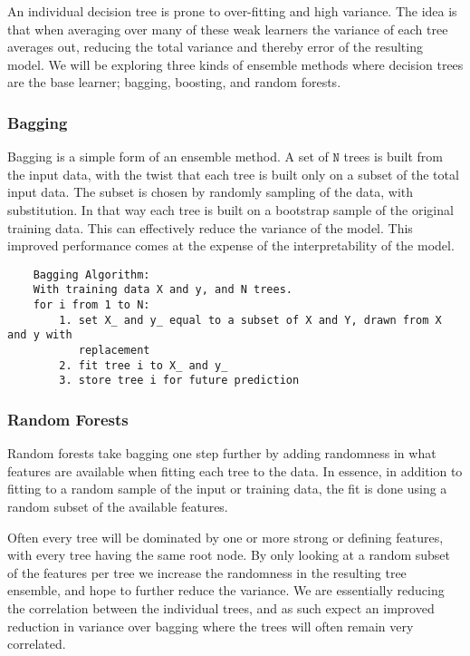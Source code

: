 \documentclass[11pt]{article}
\begin{document}
An individual decision tree is prone to over-fitting and high
variance. The idea is that when averaging over many of these weak
learners the variance of each tree averages out, reducing the total
variance and thereby error of the resulting model. We will be exploring three kinds of ensemble methods where
decision trees are the base learner; bagging, boosting, and random
forests.

    \hypertarget{bagging}{%
\subsubsection{Bagging}\label{bagging}}

Bagging is a simple form of an ensemble method. A set of \(\texttt{N}\)
trees is built from the input data, with the twist that each tree is
built only on a subset of the total input data. The subset is chosen by
randomly sampling of the data, with substitution. In that way each tree
is built on a bootstrap sample of the original training data. This can
effectively reduce the variance of the model. This improved performance
comes at the expense of the interpretability of the model.

\begin{BVerbatim}
	Bagging Algorithm:
	With training data X and y, and N trees. 
	for i from 1 to N:
	    1. set X_ and y_ equal to a subset of X and Y, drawn from X and y with 
	       replacement
	    2. fit tree i to X_ and y_ 
	    3. store tree i for future prediction
\end{BVerbatim}


    \hypertarget{random-forests}{%
\subsubsection{Random Forests}\label{random-forests}}

Random forests take bagging one step further by adding randomness in
what features are available when fitting each tree to the data. In
essence, in addition to fitting to a random sample of the input or
training data, the fit is done using a random subset of the available
features. 

Often every tree will be dominated by one or more strong or
defining features, with every tree having the same root node. By only
looking at a random subset of the features per tree we increase the
randomness in the resulting tree ensemble, and hope to further reduce
the variance. We are essentially reducing the correlation between the
individual trees, and as such expect an improved reduction in variance
over bagging where the trees will often remain very correlated.
\end{document}

